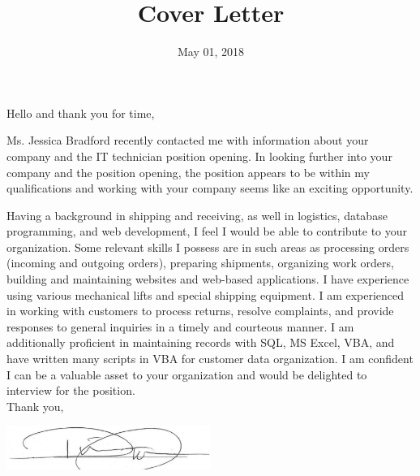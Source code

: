 \documentclass[11pt,a4paper,sans]{moderncv}        %
\title{Cover Letter}                               %
\begin{document}
\date{May 01, 2018}
\opening{Hello and thank you for time,}
\closing{}
\makelettertitle


Ms. Jessica Bradford recently contacted me with information about your company and the IT technician position opening. In looking further into your company and the position opening, the position appears to be within my qualifications and working with your company seems like an exciting opportunity.

Having a background in shipping and receiving, as well in logistics, database
programming, and web development, I feel I would be able to contribute to your organization.
Some relevant skills I possess are in such areas as processing orders (incoming and
outgoing orders), preparing shipments, organizing work orders, building and maintaining websites and web-based applications. I have experience using various mechanical lifts and special shipping equipment. I am experienced in working with customers to process returns, resolve complaints, and provide responses to general inquiries in a timely and courteous manner. I am additionally proficient in maintaining records with SQL, MS Excel, VBA,
and have written many scripts in VBA for customer data organization.
\newline
\newline
I am confident I can be a valuable asset to your organization and would be delighted to
interview for the position.\newline \newline \newline \\ 


Thank you,


\begin{minipage}{\textwidth}
  \includegraphics[width=0.5\textwidth]{sig.png} \\
\end{minipage}
\makeletterclosing
\end{document}
